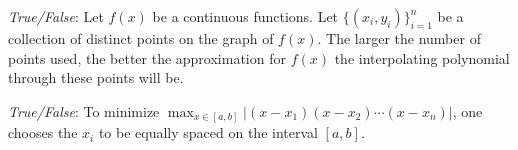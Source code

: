 \documentclass[11pt,letterpaper]{article}
\begin{document}
\quizsol \textit{True/False}: Let $f(x)$ be a continuous functions. Let $\{ (x_i, y_i) \}_{i=1}^n$ be a collection of distinct points on the graph of $f(x)$. The larger the number of points used, the better the approximation for $f(x)$ the interpolating polynomial through these points will be. 

\quizsol \textit{True/False}: To minimize $\max _{x \in [a, b]} |(x - x_1)(x - x_2) \cdots (x - x_n)|$, one chooses the $x_i$ to be equally spaced on the interval $[a, b]$. 
\end{document}
